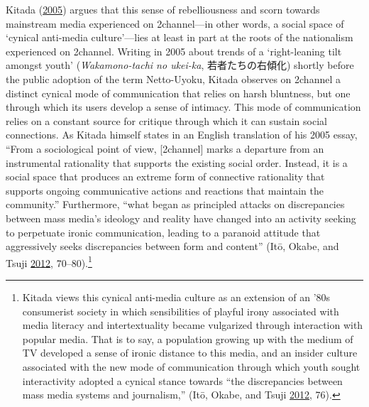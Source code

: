 \documentclass[10pt,british,A4paper,,openany]{memoir}
\begin{document}
Kitada (\protect\hyperlink{ref-kitada_eng:_2005}{2005}) argues that this
sense of rebelliousness and scorn towards mainstream media experienced
on 2channel---in other words, a social space of `cynical anti-media
culture'---lies at least in part at the roots of the nationalism
experienced on 2channel. Writing in 2005 about trends of a
`right-leaning tilt amongst youth' (\emph{Wakamono-tachi no ukei-ka},
若者たちの右傾化) shortly before the public adoption of the term
Netto-Uyoku, Kitada observes on 2channel a distinct cynical mode of
communication that relies on harsh bluntness, but one through which its
users develop a sense of intimacy. This mode of communication relies on
a constant source for critique through which it can sustain social
connections. As Kitada himself states in an English translation of his
2005 essay, ``From a sociological point of view, {[}2channel{]} marks a
departure from an instrumental rationality that supports the existing
social order. Instead, it is a social space that produces an extreme
form of connective rationality that supports ongoing communicative
actions and reactions that maintain the community.'' Furthermore, ``what
began as principled attacks on discrepancies between mass media's
ideology and reality have changed into an activity seeking to perpetuate
ironic communication, leading to a paranoid attitude that aggressively
seeks discrepancies between form and content'' (Itō, Okabe, and Tsuji
\protect\hyperlink{ref-ito_fandom_2012}{2012}, 70--80).\footnote{Kitada
  views this cynical anti-media culture as an extension of an '80s
  consumerist society in which sensibilities of playful irony associated
  with media literacy and intertextuality became vulgarized through
  interaction with popular media. That is to say, a population growing
  up with the medium of TV developed a sense of ironic distance to this
  media, and an insider culture associated with the new mode of
  communication through which youth sought interactivity adopted a
  cynical stance towards ``the discrepancies between mass media systems
  and journalism,'' (Itō, Okabe, and Tsuji
  \protect\hyperlink{ref-ito_fandom_2012}{2012}, 76).}
\end{document}
